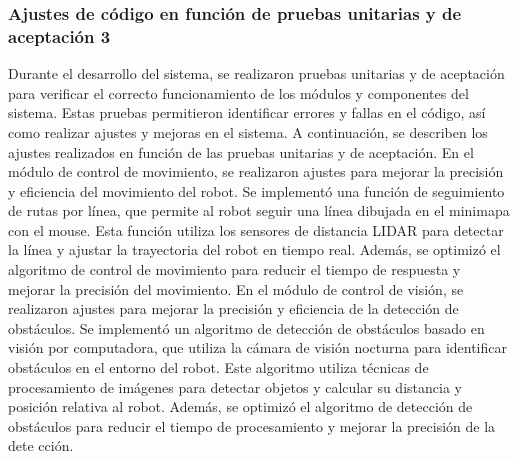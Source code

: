 \subsubsection{Ajustes de c\'odigo en funci\'on de pruebas unitarias y de aceptaci\'on 3} %
\label{sub:Ajustes de c\'odigo en funci\'on de pruebas unitarias y de aceptaci\'on}
    Durante el desarrollo del sistema, se realizaron pruebas unitarias y de aceptaci\'on para verificar el correcto funcionamiento 
        de los m\'odulos y componentes del sistema. Estas pruebas permitieron identificar errores y fallas en el c\'odigo, 
        as\'i como realizar ajustes y mejoras en el sistema. A continuaci\'on, se describen los ajustes realizados en funci\'on 
        de las pruebas unitarias y de aceptaci\'on.
    \vskip 0.5cm
    En el m\'odulo de control de movimiento, se realizaron ajustes para mejorar la precisi\'on y eficiencia del movimiento del robot. 
        Se implement\'o una funci\'on de seguimiento de rutas por l\'inea, que permite al robot seguir una l\'inea dibujada en el 
        minimapa con el mouse. Esta funci\'on utiliza los sensores de distancia LIDAR para detectar la l\'inea y ajustar la 
        trayectoria del robot en tiempo real. Adem\'as, se optimiz\'o el algoritmo de control de movimiento para reducir 
        el tiempo de respuesta y mejorar la precisi\'on del movimiento.
    \vskip 0.5cm
    En el m\'odulo de control de visi\'on, se realizaron ajustes para mejorar la precisi\'on y eficiencia de la detecci\'on de obst\'aculos. 
        Se implement\'o un algoritmo de detecci\'on de obst\'aculos basado en visi\'on por computadora, que utiliza la c\'amara de 
        visi\'on nocturna para identificar obst\'aculos en el entorno del robot. Este algoritmo utiliza t\'ecnicas de procesamiento 
        de im\'agenes para detectar objetos y calcular su distancia y posici\'on relativa al robot. Adem\'as, se optimiz\'o el 
        algoritmo de detecci\'on de obst\'aculos para reducir el tiempo de procesamiento y mejorar la precisi\'on de la dete
        cci\'on.
    \vskip 0.5cm
